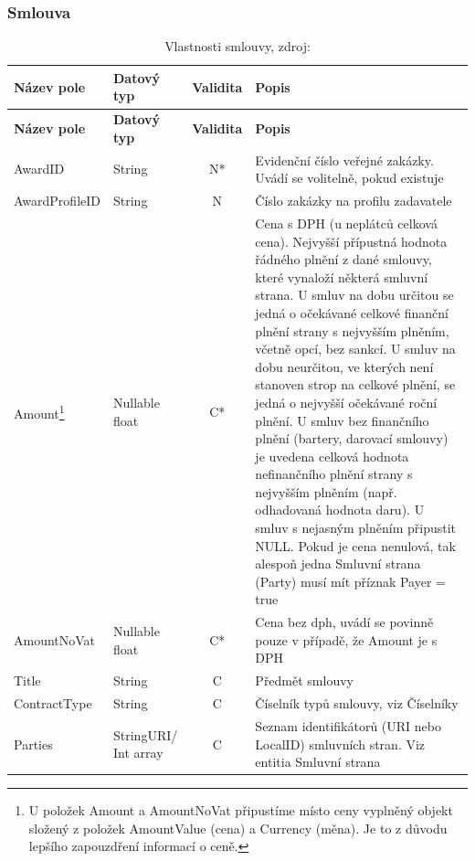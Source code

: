 \subsubsection*{Smlouva}

\begin{center}
\begin{longtable}{lp{20mm}cp{65mm}}
\label{grid_mlmmh} \\
\multicolumn{1}{l}{\textbf{Název pole}} & 
\multicolumn{1}{l}{\textbf{Datový typ}} & 
\multicolumn{1}{l}{\textbf{Validita}} & 
\multicolumn{1}{l}{\textbf{Popis}} \\ \hline 
\endfirsthead
\multicolumn{1}{l}{\textbf{Název pole}} & 
\multicolumn{1}{l}{\textbf{Datový typ}} & 
\multicolumn{1}{l}{\textbf{Validita}} & 
\multicolumn{1}{l}{\textbf{Popis}} \\ \hline 
\hline
\endhead
\endfoot
\caption[Vlastnosti smlouvy]{Vlastnosti smlouvy, zdroj:\cite{metodika, standard}}
\endlastfoot
AwardID & String & N* & Evidenční číslo veřejné zakázky. Uvádí se volitelně, pokud existuje \\
AwardProfileID & String & N & Číslo zakázky na profilu zadavatele \\
\rowcolor{validateC}Amount\footnote{U položek Amount a AmountNoVat připustíme místo ceny vyplněný objekt složený z položek AmountValue (cena) a Currency (měna). Je to z důvodu lepšího zapouzdření informací o ceně.} & Nullable float & C* & Cena s DPH (u neplátců celková cena). Nejvyšší přípustná hodnota řádného plnění z dané smlouvy, které vynaloží některá smluvní strana. U smluv na dobu určitou se jedná o očekávané celkové finanční plnění strany s nejvyšším plněním, včetně opcí, bez sankcí. U smluv na dobu neurčitou, ve kterých není stanoven strop na celkové plnění, se jedná o nejvyšší očekávané roční plnění. U smluv bez finančního plnění (bartery, darovací smlouvy) je uvedena celková hodnota nefinančního plnění strany s nejvyšším plněním (např. odhadovaná hodnota daru). U smluv s nejasným plněním připustit NULL. Pokud je cena nenulová, tak alespoň jedna Smluvní strana (Party) musí mít příznak Payer = true \\
\rowcolor{validateC}AmountNoVat & Nullable float & C* & Cena bez dph, uvádí se povinně pouze v případě, že Amount je s DPH \\
\rowcolor{validateC}Title & String & C & Předmět smlouvy \\
\rowcolor{validateC}ContractType & String & C & Číselník typů smlouvy, viz Číselníky \\
\rowcolor{validateC}Parties & StringURI/ Int array & C & Seznam identifikátorů (URI nebo LocalID) smluvních stran. Viz entitia Smluvní strana \\

\end{longtable}
\end{center}
